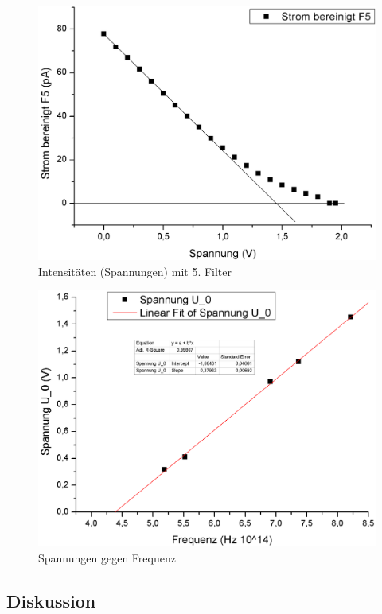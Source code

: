 \documentclass[12pt,a4paper]{article}
\begin{document}
\begin{multicols}{2}
\begin{figure}[H]
	\centering
	\includegraphics[scale=0.35]{./data/Filter5.png}
	\caption{Intensitäten (Spannungen) mit 5. Filter}
	\label{fig:filter5}
\end{figure}

\begin{figure}[H]
	\centering
	\includegraphics[scale=0.35]{./data/U0_Plank.png}
	\caption{Spannungen gegen Frequenz}
	\label{fig:plank}
\end{figure}

\subsection{Diskussion}


\end{multicols}
\end{document}
